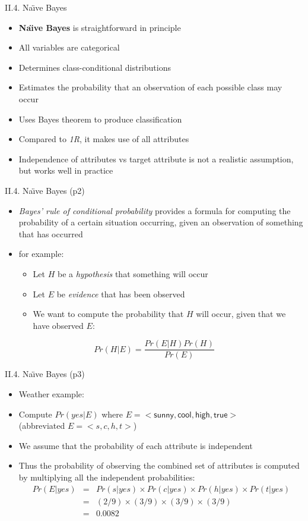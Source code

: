 \documentclass[handout]{beamer}
\newcommand{\stronger}[1]{\textbf{\color{purple} #1}}
\begin{document}
\begin{frame}{II.4. Na\"{\i}ve Bayes}
\begin{itemize}
\item[] \stronger{Na\"{\i}ve Bayes} is straightforward in principle
\item All variables are categorical
\item Determines class-conditional distributions
\item Estimates the probability that an observation of each possible class may occur
\item Uses Bayes theorem to produce classification
\item Compared to \emph{1R}, it makes use of all attributes
\item Independence of attributes vs target attribute is not a realistic assumption, but works well in practice
\end{itemize}
\end{frame}
\begin{frame}{II.4. Na\"{\i}ve Bayes (p2)}
\begin{itemize}
\item \emph{Bayes' rule of conditional probability} provides a formula for computing the probability of a certain situation occurring, given an observation of something that has occurred
\item for example:
	\begin{itemize}
	\item Let $H$ be a \emph{hypothesis} that something will occur
	\item Let $E$ be \emph{evidence} that has been observed\\
	\item We want to compute the probability that $H$ will occur, given that we have observed $E$:
	\end{itemize}
\end{itemize}
\[
Pr(H|E) = \frac{Pr(E|H)Pr(H)}{Pr(E)}
\]
\end{frame}
\begin{frame}{II.4. Na\"{\i}ve Bayes (p3)}
\begin{itemize}
\item Weather example:
\item Compute $Pr(yes|E)$
where $E=< \mathsf{sunny, cool, high, true} >$\\
(abbreviated $E=<s,c,h,t>$)
\item We assume that the probability of each attribute is independent
\item Thus the probability of observing the combined set of attributes is computed by multiplying all the independent probabilities:
\begin{eqnarray*}
Pr(E|yes) & = & Pr(s|yes) \times Pr(c|yes) \times Pr(h|yes) \times Pr(t|yes) \\
          & = & (2/9) \times (3/9) \times (3/9) \times (3/9) \\
          & = & 0.0082
\end{eqnarray*}
\end{itemize}
\end{frame}
\end{document}
